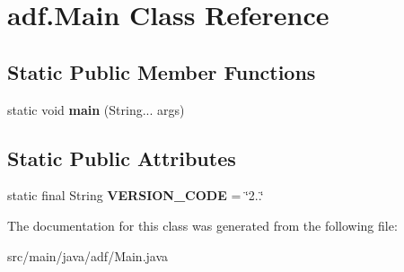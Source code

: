 \hypertarget{classadf_1_1Main}{}\section{adf.\+Main Class Reference}
\label{classadf_1_1Main}
\subsection*{Static Public Member Functions}
\begin{DoxyCompactItemize}
\item 
\hypertarget{classadf_1_1Main_a45568b0c48f2f7ddc2105e2a402a83a5}{}\label{classadf_1_1Main_a45568b0c48f2f7ddc2105e2a402a83a5} 
static void {\bfseries main} (String... args)
\end{DoxyCompactItemize}
\subsection*{Static Public Attributes}
\begin{DoxyCompactItemize}
\item 
\hypertarget{classadf_1_1Main_a6725c63fe6a57e42c32b0ff3aac3dfbe}{}\label{classadf_1_1Main_a6725c63fe6a57e42c32b0ff3aac3dfbe} 
static final String {\bfseries V\+E\+R\+S\+I\+O\+N\+\_\+\+C\+O\+DE} = \char`\"{}2..\char`\"{}
\end{DoxyCompactItemize}


The documentation for this class was generated from the following file\+:\begin{DoxyCompactItemize}
\item 
src/main/java/adf/Main.\+java\end{DoxyCompactItemize}
